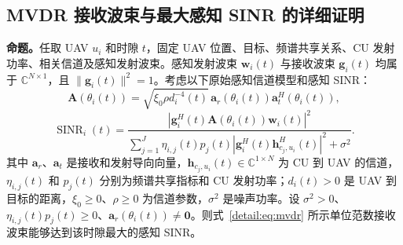 \subsection{MVDR 接收波束与最大感知 SINR 的详细证明}

\noindent\textbf{命题。}任取 UAV $u_i$ 和时隙 $t$，固定 UAV 位置、目标、频谱共享关系、CU 发射功率、相关信道及感知发射波束。感知发射波束 $\bm w_i(t)$ 与接收波束 $\bm g_i(t)$ 均属于 $\mathbb C^{N\times1}$，且 $\|\bm g_i(t)\|^2=1$。考虑以下原始感知信道模型和感知 SINR：
\begin{equation}\label{detail:eq:channel}
\mathbf A(\theta_i(t))
=\sqrt{\xi_0\rho d_i^{-4}(t)}\,
\bm a_r(\theta_i(t))\bm a_t^H(\theta_i(t)),
\end{equation}
\begin{equation}\label{detail:eq:original-sinr}
\operatorname{SINR}_i(t)=
\frac{\left|\bm g_i^H(t)\mathbf A(\theta_i(t))\bm w_i(t)\right|^2}
{\displaystyle\sum_{j=1}^J\eta_{i,j}(t)p_j(t)
\left|\bm g_i^H(t)\bm h_{c_j,u_i}^{H}(t)\right|^2+\sigma^2}.
\end{equation}
其中 $\bm a_r$、$\bm a_t$ 是接收和发射导向向量，$\bm h_{c_j,u_i}(t)\in\mathbb C^{1\times N}$ 为 CU 到 UAV 的信道，$\eta_{i,j}(t)$ 和 $p_j(t)$ 分别为频谱共享指标和 CU 发射功率；$d_i(t)>0$ 是 UAV 到目标的距离，$\xi_0\ge0$、$\rho\ge0$ 为信道参数，$\sigma^2$ 是噪声功率。设 $\sigma^2>0$、$\eta_{i,j}(t)p_j(t)\ge0$、$\bm a_r(\theta_i(t))\ne\bm0$。则式~\eqref{detail:eq:mvdr} 所示单位范数接收波束能够达到该时隙最大的感知 SINR。

